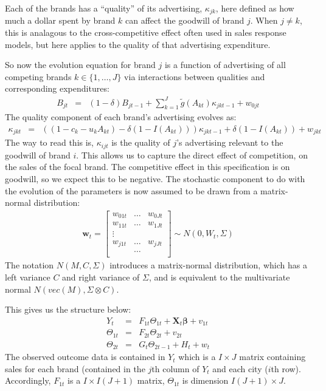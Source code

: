 \documentclass[11pt]{article} %
\begin{document}
Each of the brands has a ``quality'' of its advertising, $\kappa_{jk}$, here defined as how much a dollar spent by brand
$k$ can affect the goodwill of brand $j$.  When $j \neq k$, this is analagous to the cross-competitive effect often
used in sales response models, but here applies to the quality of that advertising expenditure.   

So now the evolution equation for brand $j$ is a function of advertising of all competing brands $k \in \{ 1,\ldots, J \}$
via interactions between qualities and corresponding expenditures:
\begin{eqnarray}
\label{eqn:b1t}
B_{jt} & = & (1-\delta) B_{jt-1} + \sum_{k=1}^J \tilde{g} (A_{kt}) \kappa_{jkt-1} +  w_{0jt}
\end{eqnarray}
The quality component of each brand's advertising evolves as:
\begin{eqnarray}
\kappa_{jkt} & = & \left((1-c_k-u_k A_{kt}) - \delta(1-I(A_{kt})) \right) \kappa_{jkt-1} + \delta(1-I(A_{kt})) + w_{jkt}
\end{eqnarray}
The way to read this is, $\kappa_{ijt}$ is the quality of $j$'s advertising relevant to the goodwill of brand $i$.   This allows
us to capture the direct effect of competition, on the sales of the focal brand.  The competitive effect in this specification
is on goodwill, so we expect this to be negative.  The stochastic component to do with the evolution of
the parameters is now assumed to be drawn from a matrix-normal distribution:
\begin{eqnarray}
\mathbf{w}_{t} =\left[ \begin{array}{ccc} 
			w_{01t} &\ldots & w_{0Jt} \\
			w_{11t} & \ldots  & w_{1Jt}   \\
\vdots\\
			w_{j1t}   & \ldots & w_{jJt}  \\
&\ldots\\
			\end{array} \right] \sim N(0,W_t, \Sigma)
\end{eqnarray}
The notation $N(M,C,\Sigma)$ introduces a matrix-normal distribution, which has a left variance $C$ and 
right variance of $\Sigma$, and is equivalent to the multivariate normal $N(vec(M), \Sigma \otimes C)$.

This gives us the structure below: 
\begin{eqnarray}
Y_t & = & F_{1t} \Theta_{1t} + \mathbf{X}_{t} \mathbf{\beta}  +  v_{1t}\nonumber\\
\Theta_{1t} & = & F_{2t} \Theta_{2t}  +  v_{2t}\nonumber\\
\Theta_{2t} & = & G_t \Theta_{2t-1} + H_t + w_t
\end{eqnarray}
The observed outcome data is contained in $Y_t$ which is a $I \times J$ matrix containing
sales for each brand (contained in the $j$th column of $Y_t$ and each city ($i$th row).
Accordingly, $F_{1t}$ is a $I \times I(J+1)$ matrix, $\Theta_{1t}$ is dimension $I(J+1) \times J$.  
\end{document}

